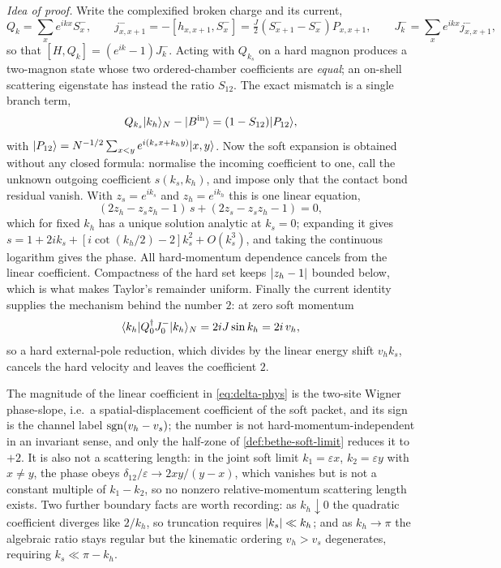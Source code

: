 \emph{Idea of proof.} Write the complexified broken charge and its current,
\begin{equation}
  Q_k=\sum_xe^{ikx}S^-_x,\qquad
  j^-_{x,x+1}=-[h_{x,x+1},S^-_x]=\tfrac{J}{2}(S^-_{x+1}-S^-_x)P_{x,x+1},
  \qquad J^-_k=\sum_xe^{ikx}j^-_{x,x+1},
\end{equation}
so that $[H,Q_k]=(e^{ik}-1)J^-_k$. Acting with $Q_{k_s}$ on a hard magnon
produces a two-magnon state whose two ordered-chamber coefficients are
\emph{equal}; an on-shell scattering eigenstate has instead the ratio
$S_{12}$. The exact mismatch is a single branch term,
\begin{equation}
  Q_{k_s}|k_h\rangle_N-|B^{\mathrm{in}}\rangle=(1-S_{12})|P_{12}\rangle,
  \label{eq:R8-mismatch}
\end{equation}
with $|P_{12}\rangle=N^{-1/2}\sum_{x<y}e^{i(k_sx+k_hy)}|x,y\rangle$. Now the soft
expansion is obtained without any closed formula: normalise the incoming
coefficient to one, call the unknown outgoing coefficient $s(k_s,k_h)$, and
impose only that the contact bond residual vanish. With $z_s=e^{ik_s}$ and
$z_h=e^{ik_h}$ this is one linear equation,
\begin{equation}
  (2z_h-z_sz_h-1)\,s+(2z_s-z_sz_h-1)=0 ,
  \label{eq:contact-equation}
\end{equation}
which for fixed $k_h$ has a unique solution analytic at $k_s=0$; expanding it
gives $s=1+2ik_s+[i\cot(k_h/2)-2]k_s^2+O(k_s^3)$, and taking the continuous
logarithm gives the phase. All hard-momentum dependence cancels from the
linear coefficient. Compactness of the hard set keeps $\lvert z_h-1\rvert$ bounded
below, which is what makes Taylor's remainder uniform. Finally the current
identity supplies the mechanism behind the number $2$: at zero soft momentum
\begin{equation}
  \langle k_h|Q_0^{\dagger}J^-_0|k_h\rangle_N=2iJ\sin k_h=2i\,v_h ,
  \label{eq:ward-residue}
\end{equation}
so a hard external-pole reduction, which divides by the linear energy shift
$v_hk_s$, cancels the hard velocity and leaves the coefficient $2$.

\begin{remark}
\label{rem:not-a-scattering-length}
The magnitude of the linear coefficient in \cref{eq:delta-phys} is the
two-site Wigner phase-slope, i.e.\ a spatial-displacement coefficient of the
soft packet, and its sign is the channel label $\operatorname{sgn}(v_h-v_s)$; the number is
not hard-momentum-independent in an invariant sense, and only the half-zone of
\cref{def:bethe-soft-limit} reduces it to $+2$. It is also not a scattering
length: in the joint soft limit $k_1=\varepsilon x$, $k_2=\varepsilon y$ with
$x\ne y$, the phase obeys $\delta_{12}/\varepsilon\to 2xy/(y-x)$, which
vanishes but is not a constant multiple of $k_1-k_2$, so no nonzero
relative-momentum scattering length exists. Two further boundary facts are
worth recording: as $k_h\downarrow0$ the quadratic coefficient diverges like
$2/k_h$, so truncation requires $\lvert k_s\rvert\ll k_h$; and as $k_h\to\pi$ the
algebraic ratio stays regular but the kinematic ordering $v_h>v_s$ degenerates,
requiring $k_s\ll\pi-k_h$.
\end{remark}

